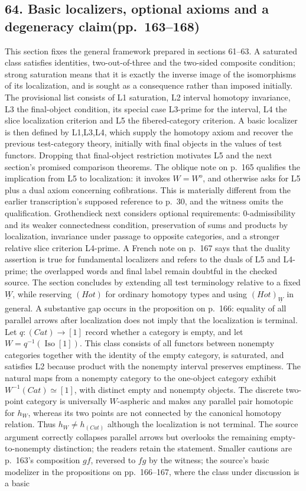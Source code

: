 \documentclass[10pt,oneside]{book}
\begin{document}
\subsection*{64. Basic localizers, optional axioms and a degeneracy claim\newline (pp.~163--168)}
This section fixes the general framework prepared in sections 61--63. A saturated class satisfies identities, two-out-of-three and the two-sided composite condition; strong saturation means that it is exactly the inverse image of the isomorphisms of its localization, and is sought as a consequence rather than imposed initially. The provisional list consists of L1 saturation, L2 interval homotopy invariance, L3 the final-object condition, its special case L3-prime for the interval, L4 the slice localization criterion and L5 the fibered-category criterion. A basic localizer is then defined by L1,L3,L4, which supply the homotopy axiom and recover the previous test-category theory, initially with final objects in the values of test functors. Dropping that final-object restriction motivates L5 and the next section's promised comparison theorems. The oblique note on p.~165 qualifies the implication from L5 to localization: it invokes $W=W^o$, and otherwise asks for L5 plus a dual axiom concerning cofibrations. This is materially different from the earlier transcription's supposed reference to p.~30, and the witness omits the qualification. Grothendieck next considers optional requirements: 0-admissibility and its weaker connectedness condition, preservation of sums and products by localization, invariance under passage to opposite categories, and a stronger relative slice criterion L4-prime. A French note on p.~167 says that the duality assertion is true for fundamental localizers and refers to the duals of L5 and L4-prime; the overlapped words and final label remain doubtful in the checked source. The section concludes by extending all test terminology relative to a fixed $\underline W$, while reserving $(Hot)$ for ordinary homotopy types and using $(Hot)_{\underline W}$ in general. A substantive gap occurs in the proposition on p.~166: equality of all parallel arrows after localization does not imply that the localization is terminal. Let $q:(Cat)\to[1]$ record whether a category is empty, and let $W=q^{-1}(\operatorname{Iso}[1])$. This class consists of all functors between nonempty categories together with the identity of the empty category, is saturated, and satisfies L2 because product with the nonempty interval preserves emptiness. The natural maps from a nonempty category to the one-object category exhibit $W^{-1}(Cat)\simeq[1]$, with distinct empty and nonempty objects. The discrete two-point category is universally $W$-aspheric and makes any parallel pair homotopic for $h_W$, whereas its two points are not connected by the canonical homotopy relation. Thus $h_W\ne h_{(Cat)}$ although the localization is not terminal. The source argument correctly collapses parallel arrows but overlooks the remaining empty-to-nonempty distinction; the readers retain the statement. Smaller cautions are p.~163's composition $gf$, reversed to $fg$ by the witness; the source's basic modelizer in the propositions on pp.~166--167, where the class under discussion is a basic 
\end{document}
